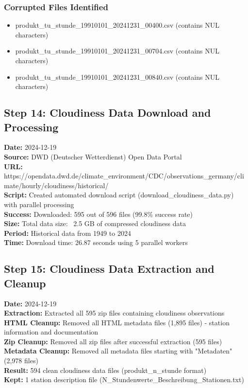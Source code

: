 \documentclass[11pt,a4paper]{article}
\begin{document}
\subsubsection{Corrupted Files Identified}
\begin{itemize}
    \item produkt\_tu\_stunde\_19910101\_20241231\_00400.csv (contains NUL characters)
    \item produkt\_tu\_stunde\_19910101\_20241231\_00704.csv (contains NUL characters)
    \item produkt\_tu\_stunde\_19910101\_20241231\_00840.csv (contains NUL characters)
\end{itemize}

\subsection{Step 14: Cloudiness Data Download and Processing}
\textbf{Date:} 2024-12-19\\
\textbf{Source:} DWD (Deutscher Wetterdienst) Open Data Portal\\
\textbf{URL:} https://opendata.dwd.de/climate\_environment/CDC/observations\_germany/climate/hourly/cloudiness/historical/\\
\textbf{Script:} Created automated download script (download\_cloudiness\_data.py) with parallel processing\\
\textbf{Success:} Downloaded: 595 out of 596 files (99.8\% success rate)\\
\textbf{Size:} Total data size: ~2.5 GB of compressed cloudiness data\\
\textbf{Period:} Historical data from 1949 to 2024\\
\textbf{Time:} Download time: 26.87 seconds using 5 parallel workers

\subsection{Step 15: Cloudiness Data Extraction and Cleanup}
\textbf{Date:} 2024-12-19\\
\textbf{Extraction:} Extracted all 595 zip files containing cloudiness observations\\
\textbf{HTML Cleanup:} Removed all HTML metadata files (1,895 files) - station information and documentation\\
\textbf{Zip Cleanup:} Removed all zip files after successful extraction (595 files)\\
\textbf{Metadata Cleanup:} Removed all metadata files starting with "Metadaten" (2,978 files)\\
\textbf{Result:} 594 clean cloudiness data files (produkt\_n\_stunde format)\\
\textbf{Kept:} 1 station description file (N\_Stundenwerte\_Beschreibung\_Stationen.txt)
\end{document}
